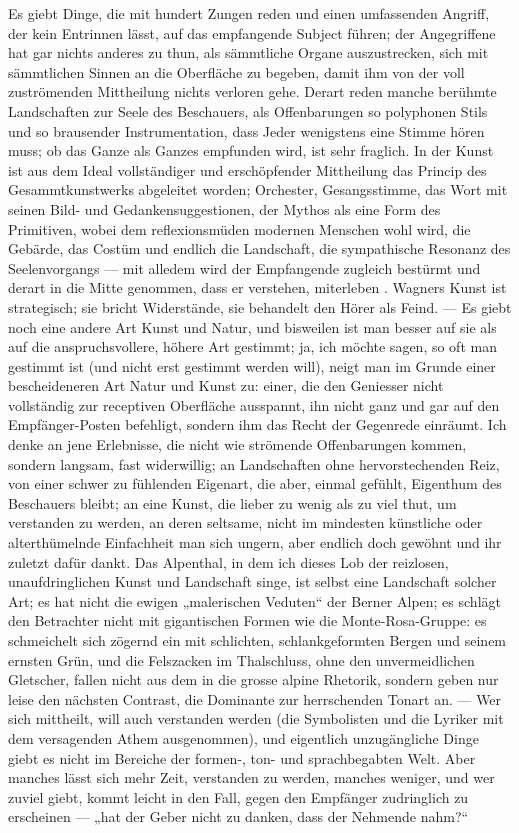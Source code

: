 Es giebt Dinge, die mit hundert Zungen reden und einen umfassenden Angriff, der kein Entrinnen lässt, auf das empfangende Subject führen; der Angegriffene hat gar nichts anderes zu thun, als sämmtliche Organe auszustrecken, sich mit sämmtlichen Sinnen an die Oberfläche zu begeben, damit ihm von der voll zuströmenden Mittheilung nichts verloren gehe. Derart reden manche berühmte Landschaften zur Seele des Beschauers, als Offenbarungen so polyphonen Stils und so brausender Instrumentation, dass Jeder wenigstens eine Stimme hören muss; ob das Ganze als Ganzes empfunden wird, ist sehr fraglich. In der Kunst ist aus dem Ideal vollständiger und erschöpfender Mittheilung das Princip des Gesammtkunstwerks abgeleitet worden; Orchester, Gesangsstimme, das Wort mit seinen Bild- und Gedankensuggestionen, der Mythos als eine Form des Primitiven, wobei dem reflexionsmüden modernen Menschen wohl wird, die Gebärde, das Costüm und endlich die Landschaft, die sympathische Resonanz des Seelenvorgangs — mit alledem wird der Empfangende zugleich bestürmt und derart in die Mitte genommen, dass er verstehen, miterleben . Wagners Kunst ist strategisch; sie bricht Widerstände, sie behandelt den Hörer  als Feind. — Es giebt noch eine andere Art Kunst und Natur, und bisweilen ist man besser auf sie als auf die anspruchsvollere, höhere Art gestimmt; ja, ich möchte sagen, so oft man gestimmt ist (und nicht erst gestimmt werden will), neigt man im Grunde einer bescheideneren Art Natur und Kunst zu: einer, die den Geniesser nicht vollständig zur receptiven Oberfläche ausspannt, ihn nicht ganz und gar auf den Empfänger-Posten befehligt, sondern ihm das Recht der Gegenrede einräumt. Ich denke an jene Erlebnisse, die nicht wie strömende Offenbarungen kommen, sondern langsam, fast widerwillig; an Landschaften ohne hervorstechenden Reiz, von einer schwer zu fühlenden Eigenart, die aber, einmal gefühlt, Eigenthum des Beschauers bleibt; an eine Kunst, die lieber zu wenig als zu viel thut, um verstanden zu werden, an deren seltsame, nicht im mindesten künstliche oder alterthümelnde Einfachheit man sich ungern, aber endlich doch gewöhnt und ihr zuletzt dafür dankt. Das Alpenthal, in dem ich dieses Lob der reizlosen, unaufdringlichen Kunst und Landschaft singe, ist selbst eine Landschaft solcher Art; es hat nicht die ewigen „malerischen Veduten“ der Berner Alpen; es schlägt den Betrachter nicht mit gigantischen Formen wie die Monte-Rosa-Gruppe: es schmeichelt sich zögernd ein mit schlichten, schlankgeformten Bergen und seinem ernsten Grün, und die Felszacken im Thalschluss, ohne den unvermeidlichen Gletscher, fallen nicht aus dem  in die grosse alpine Rhetorik, sondern geben nur leise den nächsten Contrast, die Dominante zur herrschenden Tonart an. — Wer sich mittheilt, will auch verstanden werden (die Symbolisten und die  Lyriker mit dem versagenden Athem ausgenommen), und eigentlich unzugängliche Dinge giebt es nicht im Bereiche der formen-, ton- und sprachbegabten Welt. Aber manches lässt sich mehr Zeit, verstanden zu werden, manches weniger, und wer zuviel giebt, kommt leicht in den Fall, gegen den Empfänger zudringlich zu erscheinen — „hat der Geber nicht zu danken, dass der Nehmende nahm?“
\par

